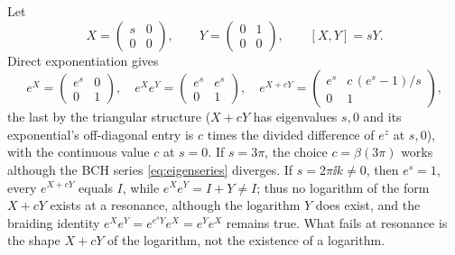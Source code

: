 \begin{example}[Resonance]\label{ex:resonance}
Let
\begin{equation}\label{eq:eigenmatrices}
 X=\begin{pmatrix}s&0\\0&0\end{pmatrix},\qquad
 Y=\begin{pmatrix}0&1\\0&0\end{pmatrix},\qquad [X,Y]=sY.
\end{equation}
Direct exponentiation gives
\[
 e^X=\begin{pmatrix}e^s&0\\0&1\end{pmatrix},\quad
 e^Xe^Y=\begin{pmatrix}e^s&e^s\\0&1\end{pmatrix},\quad
 e^{X+cY}=\begin{pmatrix}e^s&c\,(e^s-1)/s\\0&1\end{pmatrix},
\]
the last by the triangular structure ($X+cY$ has eigenvalues $s,0$ and its
exponential's off-diagonal entry is $c$ times the divided difference of
$e^z$ at $s,0$), with the continuous value $c$ at $s=0$. If $s=3\pi$, the
choice $c=\beta(3\pi)$ works although the BCH series \eqref{eq:eigenseries}
diverges. If $s=2\pi\ii k\neq0$, then $e^s=1$, every $e^{X+cY}$ equals
$I$, while $e^Xe^Y=I+Y\neq I$; thus no logarithm of the form $X+cY$ exists
at a resonance, although the logarithm $Y$ does exist, and the braiding
identity $e^Xe^Y=e^{e^sY}e^X=e^Ye^X$ remains true. What fails at resonance
is the shape $X+cY$ of the logarithm, not the existence of a logarithm.
\end{example}
